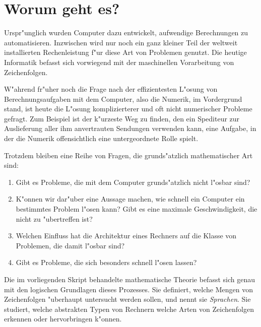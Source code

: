 %
%
%
\rhead{}
\chapter*{Worum geht es?\label{chapter-intro}}
Urspr"unglich wurden Computer dazu entwickelt, aufwendige
Berechnungen zu automatisieren. Inzwischen wird nur noch ein
ganz kleiner Teil der weltweit installierten Rechenleistung f"ur
diese Art von Problemen genutzt. 
Die heutige Informatik befasst sich vorwiegend mit der maschinellen
Vorarbeitung von Zeichenfolgen. 

W"ahrend fr"uher noch die Frage nach der effizientesten L"osung von
Berechnungsaufgaben mit dem Computer, also die Numerik, im Vordergrund stand,  
ist heute die L"osung komplizierterer und oft nicht numerischer Probleme 
gefragt. Zum Beispiel ist der k"urzeste Weg zu finden, den ein Spediteur
zur Auslieferung aller ihm anvertrauten Sendungen verwenden kann, eine
Aufgabe, in der die Numerik offensichtlich eine untergeordnete Rolle spielt.

Trotzdem bleiben eine Reihe von Fragen, die grunds"atzlich mathematischer
Art sind:
\begin{enumerate}
\item Gibt es Probleme, die mit dem Computer grunds"atzlich nicht
l"osbar sind?
\item K"onnen wir dar"uber eine Aussage machen, wie schnell ein Computer
ein bestimmtes Problem l"osen kann? Gibt es eine maximale Geschwindigkeit,
die nicht zu "ubertreffen ist?
\item Welchen Einfluss hat die Architektur eines Rechners auf die Klasse
von Problemen, die damit l"osbar sind?
\item Gibt es Probleme, die sich besonders schnell l"osen lassen?
\end{enumerate}
Die im vorliegenden Skript behandelte mathematische Theorie befasst sich
genau mit den logischen Grundlagen dieses Prozesses.
Sie definiert, welche Mengen von Zeichenfolgen "uberhaupt untersucht
werden sollen, und nennt sie {\em Sprachen}.
Sie studiert, welche abstrakten Typen von
Rechnern welche Arten von Zeichenfolgen erkennen oder hervorbringen
k"onnen. 

